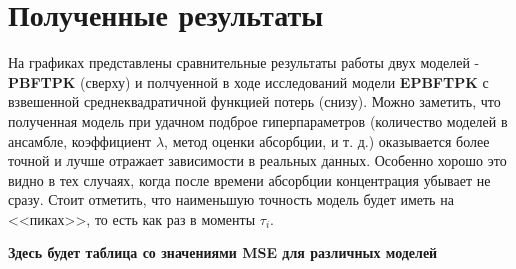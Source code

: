 \documentclass[oneside,senior,etd]{BYUPhys}
\begin{document}
\section{Полученные результаты}

На графиках представлены сравнительные результаты работы двух моделей - \textbf{PBFTPK} (сверху) и полчуенной в ходе исследований модели \textbf{EPBFTPK} с взвешенной среднеквадратичной функцией потерь (снизу). Можно заметить, что полученная модель при удачном подброе гиперпараметров (количество моделей в ансамбле, коэффициент $\lambda$, метод оценки абсорбции, и т. д.) оказывается более точной и лучше отражает зависимости в реальных данных. Особенно хорошо это видно в тех случаях, когда после времени абсорбции концентрация убывает не сразу. Стоит отметить, что наименьшую точность модель будет иметь на <<пиках>>, то есть как раз в моменты $\tau_i$.


\begin{center}
	\textbf{Здесь будет таблица со значениями MSE для различных моделей}
\end{center}

\newpage
\end{document}

